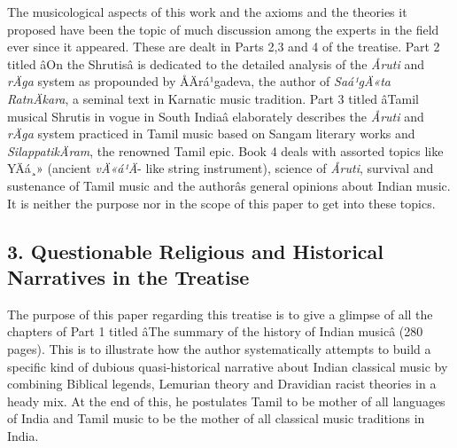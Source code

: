 The musicological aspects of this work and the axioms and the theories it proposed have been the topic of much discussion among the experts in the field ever since it appeared. These are dealt in Parts 2,3 and 4 of the treatise. Part 2 titled âOn the Shrutisâ is dedicated to the detailed analysis of the \textit{Åruti} and \textit{rÄga} system as propounded by ÅÄrá¹gadeva, the author of \textit{Saá¹gÄ«ta RatnÄkara}, a seminal text in Karnatic music tradition. Part 3 titled âTamil musical Shrutis in vogue in South Indiaâ elaborately describes the \textit{Åruti} and \textit{rÄga} system practiced in Tamil music based on Sangam literary works and \textit{SilappatikÄram}, the renowned Tamil epic. Book 4 deals with assorted topics like YÄá¸» (ancient \textit{vÄ«á¹Ä}- like string instrument), science of \textit{Åruti}, survival and sustenance of Tamil music and the authorâs general opinions about Indian music. It is neither the purpose nor in the scope of this paper to get into these topics.

\vspace{-.2cm}

\subsection*{3. Questionable Religious and Historical Narratives in the Treatise}

The purpose of this paper regarding this treatise is to give a glimpse of all the chapters of Part 1 titled âThe summary of the history of Indian musicâ (280 pages). This is to illustrate how the author systematically attempts to build a specific kind of dubious quasi-historical narrative about Indian classical music by combining Biblical legends, Lemurian theory and Dravidian racist theories in a heady mix. At the end of this, he postulates Tamil to be mother of all languages of India and Tamil music to be the mother of all classical music traditions in India.

